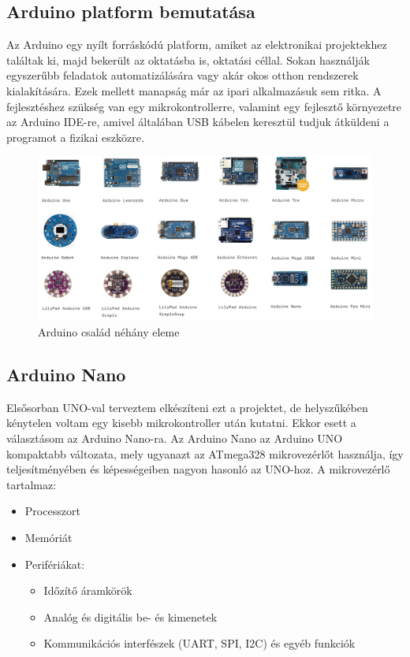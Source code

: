 \documentclass[]{thesis-ekf}
\theoremstyle{definition}
\theoremstyle{remark}
\begin{document}
\subsection{Arduino platform bemutatása}
Az Arduino\cite{arduino}\cite{whatisanarduino} egy nyílt forráskódú platform, amiket az elektronikai projektekhez találtak ki, majd bekerült az oktatásba is, oktatási céllal. Sokan használják egyszerűbb feladatok automatizálására vagy akár okos otthon rendszerek kialakítására. Ezek mellett manapság már az ipari alkalmazásuk sem ritka. A fejlesztéshez szükség van egy mikrokontrollerre, valamint egy fejlesztő környezetre az Arduino IDE-re, amivel általában USB kábelen keresztül tudjuk átküldeni a programot a fizikai eszközre.
\begin{figure}[th!]
	\centering
	\includegraphics[width=0.9\linewidth]{ArduinoFamily}
	\caption[Arduino család néhány fajtája]{Arduino család néhány eleme}
	\label{fig-arduinofamily}
\end{figure}
\subsection{Arduino Nano}
Elsősorban UNO-val\cite{arduinouno} terveztem elkészíteni ezt a projektet, de helyszűkében kénytelen voltam egy kisebb mikrokontroller után kutatni. Ekkor esett a választásom az Arduino Nano-ra\cite{arduinonano}. Az Arduino Nano az Arduino UNO kompaktabb változata, mely ugyanazt az ATmega328 mikrovezérlőt használja, így teljesítményében és képességeiben nagyon hasonló az UNO-hoz. A mikrovezérlő tartalmaz:
\begin{itemize}
	\item Processzort
	\item Memóriát
	\item Perifériákat:
	\begin{itemize}
		\item Időzítő áramkörök
		\item Analóg és digitális be- és kimenetek
		\item Kommunikációs interfészek (UART, SPI, I2C) és egyéb funkciók
	\end{itemize}
\end{itemize}
\end{document}
